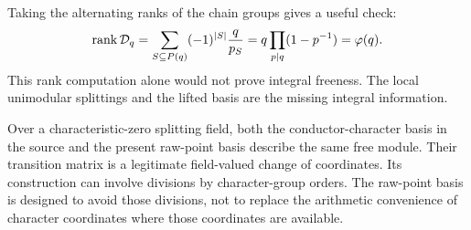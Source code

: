Taking the alternating ranks of the chain groups gives a useful check:
\begin{equation}\label{ir:eq:euler-rank}
 \operatorname{rank}\mathcal D_q
 =\sum_{S\subseteq P(q)}(-1)^{|S|}\frac{q}{p_S}
 =q\prod_{p\mid q}(1-p^{-1})=\varphi(q).
\end{equation}
This rank computation alone would not prove integral freeness. The
local unimodular splittings and the lifted basis are the missing
integral information.

\begin{remark}
Over a characteristic-zero splitting field, both the conductor-character
basis in the source and the present raw-point basis describe the same
free module. Their transition matrix is a legitimate field-valued
change of coordinates. Its construction can involve divisions by
character-group orders. The raw-point basis is designed to avoid those
divisions, not to replace the arithmetic convenience of character
coordinates where those coordinates are available.
\end{remark}
